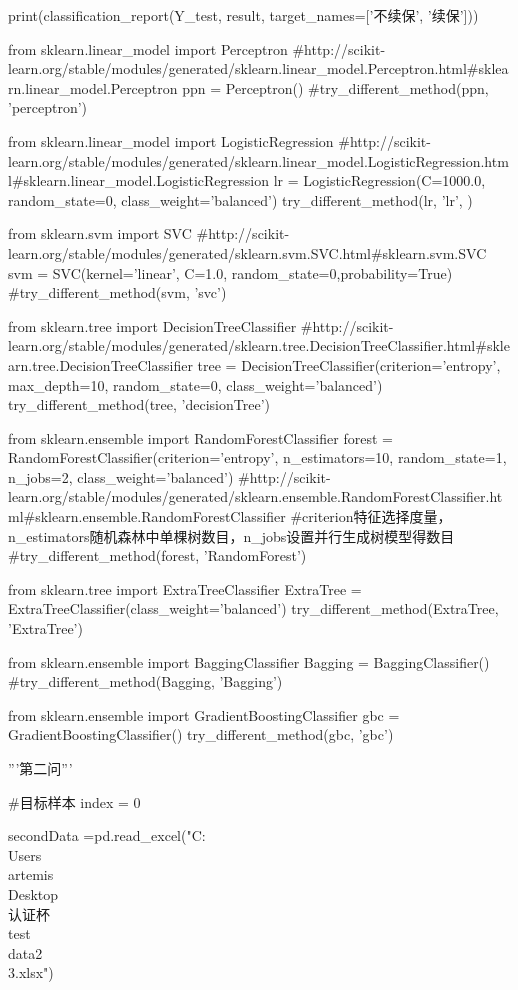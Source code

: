 \documentclass[a4paper]{article}
\begin{document}
\begin{*sec.py*}
			print(classification_report(Y_test, result, target_names=['不续保', '续保']))
			
			
			from sklearn.linear_model import Perceptron
			#http://scikit-learn.org/stable/modules/generated/sklearn.linear_model.Perceptron.html#sklearn.linear_model.Perceptron
			ppn = Perceptron()
			#try_different_method(ppn, 'perceptron')
			
			from sklearn.linear_model import LogisticRegression
			#http://scikit-learn.org/stable/modules/generated/sklearn.linear_model.LogisticRegression.html#sklearn.linear_model.LogisticRegression
			lr = LogisticRegression(C=1000.0, random_state=0, class_weight='balanced')
			try_different_method(lr, 'lr', )
			
			
			from sklearn.svm import SVC
			#http://scikit-learn.org/stable/modules/generated/sklearn.svm.SVC.html#sklearn.svm.SVC
			svm = SVC(kernel='linear', C=1.0, random_state=0,probability=True)
			#try_different_method(svm, 'svc')
			
			from sklearn.tree import DecisionTreeClassifier
			#http://scikit-learn.org/stable/modules/generated/sklearn.tree.DecisionTreeClassifier.html#sklearn.tree.DecisionTreeClassifier
			tree = DecisionTreeClassifier(criterion='entropy', max_depth=10, random_state=0, class_weight='balanced')
			try_different_method(tree, 'decisionTree')
			
			from sklearn.ensemble import RandomForestClassifier
			forest = RandomForestClassifier(criterion='entropy', n_estimators=10, random_state=1, n_jobs=2, class_weight='balanced')
			#http://scikit-learn.org/stable/modules/generated/sklearn.ensemble.RandomForestClassifier.html#sklearn.ensemble.RandomForestClassifier
			#criterion特征选择度量，n_estimators随机森林中单棵树数目，n_jobs设置并行生成树模型得数目
			#try_different_method(forest, 'RandomForest')
			
			from sklearn.tree import ExtraTreeClassifier 
			ExtraTree = ExtraTreeClassifier(class_weight='balanced')
			try_different_method(ExtraTree, 'ExtraTree')
			
			from sklearn.ensemble import BaggingClassifier
			Bagging = BaggingClassifier()
			#try_different_method(Bagging, 'Bagging')
			
			from sklearn.ensemble import GradientBoostingClassifier
			gbc = GradientBoostingClassifier()
			try_different_method(gbc, 'gbc')
			
			'''第二问'''
			
			#目标样本
			index = 0
			
			
			secondData =pd.read_excel("C:\\Users\\artemis\\Desktop\\认证杯\\test\\data2\\3.xlsx")
			

\end{*sec.py*}
\end{document}
